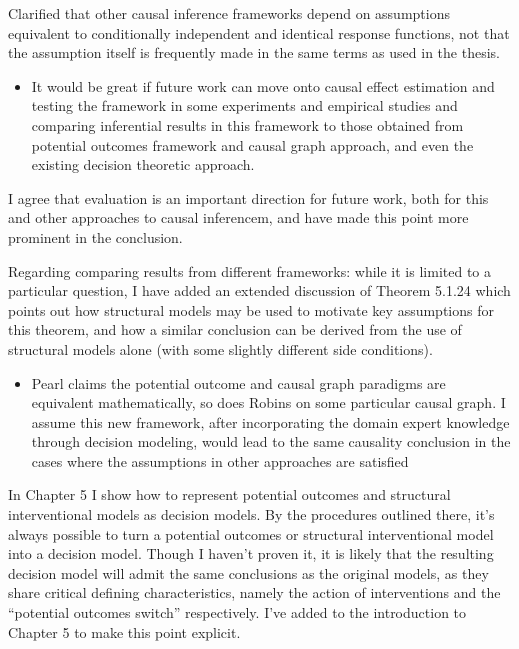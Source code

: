\documentclass[12pt, a4paper]{article}
\begin{document}
Clarified that other causal inference frameworks depend on assumptions equivalent to conditionally independent and identical response functions, not that the assumption itself is frequently made in the same terms as used in the thesis.

\begin{itemize}
    \item It would be great if future work can move onto causal effect estimation and testing the framework in some experiments and empirical studies and comparing inferential results in this framework to those obtained from potential outcomes framework and causal graph approach, and even the existing decision theoretic approach.
\end{itemize}

I agree that evaluation is an important direction for future work, both for this and other approaches to causal inferencem, and have made this point more prominent in the conclusion.

Regarding comparing results from different frameworks: while it is limited to a particular question, I have added an extended discussion of Theorem 5.1.24 which points out how structural models may be used to motivate key assumptions for this theorem, and how a similar conclusion can be derived from the use of structural models alone (with some slightly different side conditions).

\begin{itemize}
    \item Pearl claims the potential outcome and causal graph paradigms are equivalent mathematically, so does Robins on some particular causal graph. I assume this new framework, after incorporating the domain expert knowledge through decision modeling, would lead to the same causality conclusion in the cases where the assumptions in other approaches are satisfied
\end{itemize}

In Chapter 5 I show how to represent potential outcomes and structural interventional models as decision models. By the procedures outlined there, it's always possible to turn a potential outcomes or structural interventional model into a decision model. Though I haven't proven it, it is likely that the resulting decision model will admit the same conclusions as the original models, as they share critical defining characteristics, namely the action of interventions and the ``potential outcomes switch'' respectively. I've added to the introduction to Chapter 5 to make this point explicit.
\end{document}
